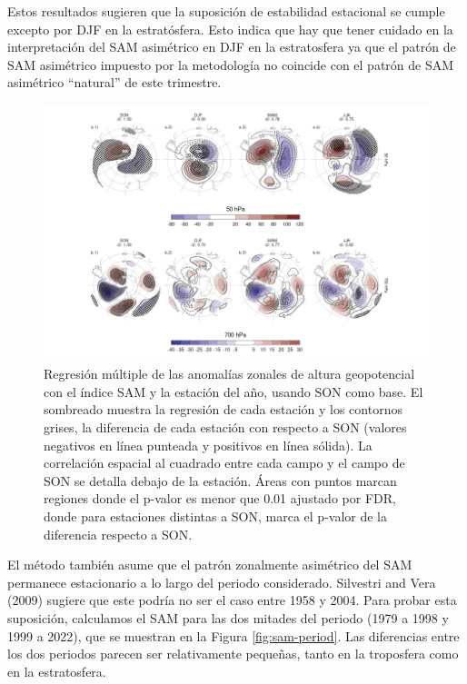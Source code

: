 \documentclass[12pt,oneside]{reedthesis}
\begin{document}
Estos resultados sugieren que la suposición de estabilidad estacional se cumple excepto por DJF en la estratósfera.
Esto indica que hay que tener cuidado en la interpretación del SAM asimétrico en DJF en la estratosfera ya que el patrón de SAM asimétrico impuesto por la metodología no coincide con el patrón de SAM asimétrico ``natural'' de este trimestre.






\begin{figure}
\includegraphics{figures/30-sam/season-regression-1} \caption{Regresión múltiple de las anomalías zonales de altura geopotencial con el índice SAM y la estación del año, usando SON como base.
El sombreado muestra la regresión de cada estación y los contornos grises, la diferencia de cada estación con respecto a SON (valores negativos en línea punteada y positivos en línea sólida).
La correlación espacial al cuadrado entre cada campo y el campo de SON se detalla debajo de la estación.
Áreas con puntos marcan regiones donde el p-valor es menor que 0.01 ajustado por FDR, donde para estaciones distintas a SON, marca el p-valor de la diferencia respecto a SON.}\label{fig:season-regression}
\end{figure}

El método también asume que el patrón zonalmente asimétrico del SAM permanece estacionario a lo largo del periodo considerado.
Silvestri and Vera (2009) sugiere que este podría no ser el caso entre 1958 y 2004.
Para probar esta suposición, calculamos el SAM para las dos mitades del periodo (1979 a 1998 y 1999 a 2022), que se muestran en la Figura \ref{fig:sam-period}.
Las diferencias entre los dos periodos parecen ser relativamente pequeñas, tanto en la troposfera como en la estratosfera.
\end{document}

